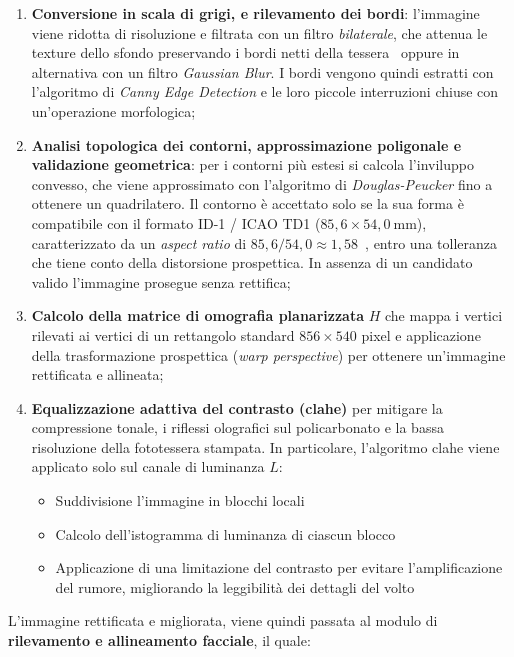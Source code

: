 \begin{enumerate}
    \item \textbf{Conversione in scala di grigi, e rilevamento dei bordi}: l'immagine viene ridotta di risoluzione e filtrata con un filtro \textit{bilaterale}, che attenua le texture dello sfondo preservando i bordi netti della tessera~\cite{tomasiBilateralFilteringGray1998} oppure in alternativa con un filtro \textit{Gaussian Blur}. 
    I bordi vengono quindi estratti con l'algoritmo di \textit{Canny Edge Detection} e le loro piccole interruzioni chiuse con un'operazione morfologica;
    \item \textbf{Analisi topologica dei contorni, approssimazione poligonale e validazione geometrica}: per i contorni più estesi si calcola l'inviluppo convesso, che viene approssimato con l'algoritmo di \textit{Douglas-Peucker} fino a ottenere un quadrilatero. 
    Il contorno è accettato solo se la sua forma è compatibile con il formato ID-1 / ICAO TD1 ($85{,}6 \times 54{,}0~\text{mm}$), caratterizzato da un \textit{aspect ratio} di $85{,}6/54{,}0 \approx 1{,}58$~\cite{icao9303}, entro una tolleranza che tiene conto della distorsione prospettica. In assenza di un candidato valido l'immagine prosegue senza rettifica;
    \item \textbf{Calcolo della matrice di omografia planarizzata} $H$ che mappa i vertici rilevati ai vertici di un rettangolo standard $856 \times 540$ pixel e applicazione della trasformazione prospettica (\textit{warp perspective}) per ottenere un'immagine rettificata e allineata;
    \item \textbf{Equalizzazione adattiva del contrasto (\gls{clahe})} per mitigare la compressione tonale, i riflessi olografici sul policarbonato e la bassa risoluzione della fototessera stampata. In particolare, l'algoritmo \gls{clahe} viene applicato solo sul canale di luminanza $L$: 
    \begin{itemize}
        \item Suddivisione l'immagine in blocchi locali
        \item Calcolo dell'istogramma di luminanza di ciascun blocco
        \item Applicazione di una limitazione del contrasto per evitare l'amplificazione del rumore, migliorando la leggibilità dei dettagli del volto
    \end{itemize}
\end{enumerate}
L'immagine rettificata e migliorata, viene quindi passata al modulo di \textbf{rilevamento e allineamento facciale}, il quale:
